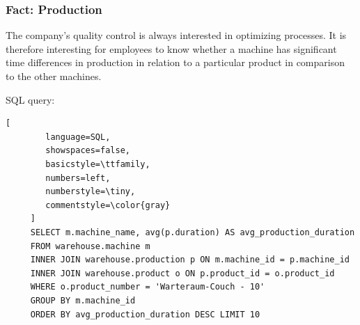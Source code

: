 \documentclass[letterpaper,12pt]{article}
\begin{document}
\subsubsection{Fact: Production}

The company's quality control is always interested in optimizing processes. It is therefore interesting for employees to know whether a machine has significant time differences in production in relation to a particular product in comparison to the other machines.

\bigskip
\noindent SQL query:
\begin{lstlisting}[
        language=SQL,
        showspaces=false,
        basicstyle=\ttfamily,
        numbers=left,
        numberstyle=\tiny,
        commentstyle=\color{gray}
     ]
     SELECT m.machine_name, avg(p.duration) AS avg_production_duration
     FROM warehouse.machine m
     INNER JOIN warehouse.production p ON m.machine_id = p.machine_id
     INNER JOIN warehouse.product o ON p.product_id = o.product_id
     WHERE o.product_number = 'Warteraum-Couch - 10'
     GROUP BY m.machine_id
     ORDER BY avg_production_duration DESC LIMIT 10
\end{lstlisting}
\end{document}
